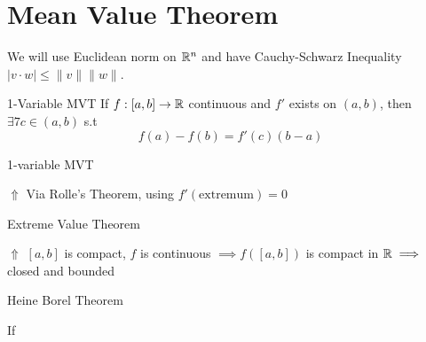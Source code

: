 \chapter{Mean Value Theorem}
We will use Euclidean norm on $\mathbb{R}^n$ and have Cauchy-Schwarz Inequality $|v\cdot w|\leq \|v\|\|w\|$.
\begin{Theorem}{1-Variable MVT}{}
	If $f:[a,b]\to \mathbb{R}$ continuous and $f'$ exists on $(a,b)$, then $\exists7 c\in(a,b)$ s.t $$f(a)-f(b)=f'(c)(b-a)$$
\end{Theorem}
\begin{myproof}1-variable MVT

\hspace{1cm} $\Uparrow$ Via Rolle's Theorem, using $f'(\text{extremum})=0$
		
\hspace*{0.5cm}Extreme Value Theorem
			
\hspace{1cm} $\Uparrow$ $[a,b]$ is compact, $f$ is continuous $\implies f([a,b])$ is compact in $\mathbb{R}\implies $ closed and bounded
			
\hspace*{0.5cm}Heine Borel Theorem
\end{myproof}

\begin{Theorem}{}{}
	If 
\end{Theorem}